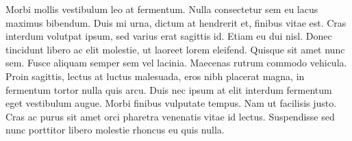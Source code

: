 Morbi mollis vestibulum leo at fermentum. Nulla consectetur sem eu lacus maximus bibendum. Duis mi urna, dictum at hendrerit et, finibus vitae est. Cras interdum volutpat ipsum, sed varius erat sagittis id. Etiam eu dui nisl. Donec tincidunt libero ac elit molestie, ut laoreet lorem eleifend. Quisque sit amet nunc sem. Fusce aliquam semper sem vel lacinia. Maecenas rutrum commodo vehicula. Proin sagittis, lectus at luctus malesuada, eros nibh placerat magna, in fermentum tortor nulla quis arcu. Duis nec ipsum at elit interdum fermentum eget vestibulum augue. Morbi finibus vulputate tempus. Nam ut facilisis justo. Cras ac purus sit amet orci pharetra venenatis vitae id lectus. Suspendisse sed nunc porttitor libero molestie rhoncus eu quis nulla. 
